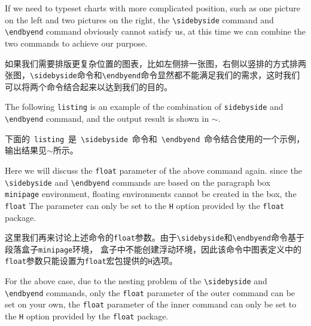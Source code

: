 \begin{ParaColumn}
    If we need to typeset charts with more complicated position, such as one picture on the left and two pictures on the right, the \verb"\sidebyside" command and \verb"\endbyend" command obviously cannot satisfy us, at this time we can combine the two commands to achieve our purpose.

    \switchcolumn

    如果我们需要排版更复杂位置的图表，比如左侧排一张图，右侧以竖排的方式排两张图，\verb"\sidebyside"命令和\verb"\endbyend"命令显然都不能满足我们的需求，这时我们可以将两个命令结合起来以达到我们的目的。

    \switchcolumn*

    The following \verb"listing" is an example of the combination of \verb"sidebyside" and \verb"\endbyend" command, and the output result is shown in $\sim$.

    \switchcolumn
    
    下面的~\verb"listing"~是~\verb"\sidebyside"~命令和~\verb"\endbyend"~命令结合使用的一个示例，输出结果见$\sim$所示。

    \CrossColumnText{
        
        
    }
    \switchcolumn*

    Here we will discuss the \verb"float" parameter of the above command again.  since the \verb"\sidebyside" and \verb"\endbyend" commands are based on the paragraph box \verb"minipage" environment, floating environments cannot be created in the box, the \verb"float" The parameter can only be set to the \verb"H" option provided by the \verb"float" package.  

    \switchcolumn

    这里我们再来讨论上述命令的\verb"float"参数。由于\verb"\sidebyside"和\verb"\endbyend"命令基于段落盒子\verb"minipage"环境， 盒子中不能创建浮动环境，因此该命令中图表定义中的\verb"float"参数只能设置为\verb"float"宏包提供的\verb"H"选项。

    \switchcolumn*
    
    For the above case, due to the nesting problem of the \verb"\sidebyside" and \verb"\endbyend" commands, only the \verb"float" parameter of the outer command can be set on your own, the \verb"float" parameter of the inner command can only be set to the \verb"H" option provided by the \verb"float" package.


\end{ParaColumn}
